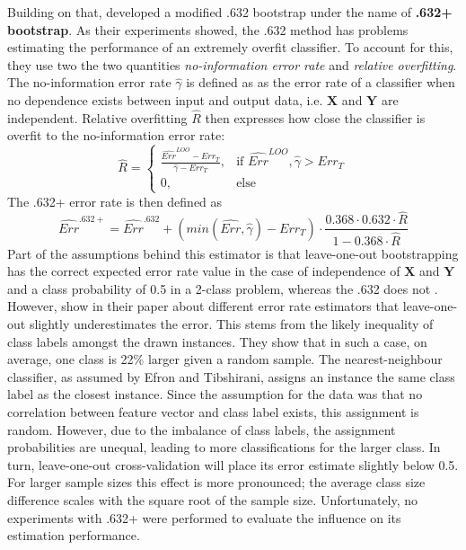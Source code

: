 Building on that, \cite{EfronEtAl1997} developed a modified .632 bootstrap under the name of \textbf{.632+ bootstrap}. As their experiments showed, the .632 method has problems estimating the performance of an extremely overfit classifier. To account for this, they use two the two quantities \textit{no-information error rate} and \textit{relative overfitting}. The no-information error rate $\hat{\gamma}$ is defined as as the error rate of a classifier when no dependence exists between input and output data, i.e. $\mathbf{X}$ and $\mathbf{Y}$ are independent. Relative overfitting $\hat{R}$ then expresses how close the classifier is overfit to the no-information error rate:
\begin{equation}
\label{eq:niRate}
\hat{R} =
\begin{cases}
	\frac{\widehat{Err}^{LOO} - Err_T}{\hat{\gamma} - Err_T}, & \text{if } \widehat{Err}^{LOO}, \hat{\gamma} > Err_T \\
	0, & \text{else}
\end{cases}
\end{equation}
The .632+ error rate is then defined as
\begin{equation}
\widehat{Err}^{.632+} = \widehat{Err}^{.632} + \left(min(\widehat{Err}, \hat{\gamma}) - Err_T\right) \cdot \frac{0.368 \cdot 0.632 \cdot \hat{R}}{1 - 0.368 \cdot \hat{R}}
\end{equation}
Part of the assumptions behind this estimator is that leave-one-out bootstrapping has the correct expected error rate value in the case of independence of $\mathbf{X}$ and $\mathbf{Y}$ and a class probability of 0.5 in a 2-class problem, whereas the .632 does not \cite{EfronEtAl1997}. However, \cite{WoodEtAl2007} show in their paper about different error rate estimators that leave-one-out slightly underestimates the error. This stems from the likely inequality of class labels amongst the drawn instances. They show that in such a case, on average, one class is 22\% larger given a random sample. The nearest-neighbour classifier, as assumed by Efron and Tibshirani, assigns an instance the same class label as the closest instance. Since the assumption for the data was that no correlation between feature vector and class label exists, this assignment is random. However, due to the imbalance of class labels, the assignment probabilities are unequal, leading to more classifications for the larger class. In turn, leave-one-out cross-validation will place its error estimate slightly below 0.5. For larger sample sizes this effect is more pronounced; the average class size difference scales with the square root of the sample size. Unfortunately, no experiments with .632+ were performed to evaluate the influence on its estimation performance.

